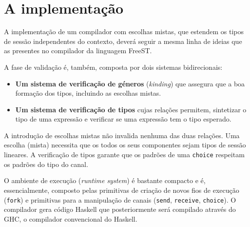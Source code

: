 \section{A implementação}

A implementação de um compilador com escolhas mistas, que estendem os tipos de sessão
independentes do contexto, deverá seguir a mesma linha de ideias que as presentes no compilador da linguagem FreeST\cite{2019freest,2019freest-inforum}.

A fase de validação é, também, composta por dois sistemas bidirecionais:
\begin{itemize}
\item \textbf{Um sistema de verificação de géneros} (\textit{kinding}) que assegura que a boa formação dos tipos, incluindo as escolhas mistas.
\item \textbf{Um sistema de verificação de tipos} cujas relações permitem, sintetizar o tipo de uma expressão e verificar se uma expressão tem o tipo esperado. 
\end{itemize}
A introdução de escolhas mistas não invalida nenhuma das duas relações.
Uma escolha (mista) necessita que os todos os seus componentes sejam tipos de sessão lineares. A verificação de tipos garante que os padrões de uma \lstinline|choice| respeitam os padrões do tipo do canal.

O ambiente de execução (\textit{runtime system}) é bastante compacto e é, essencialmente, composto pelas primitivas de criação de novos fios de execução (\lstinline|fork|) e primitivas para a manipulação de canais (\lstinline|send|, \lstinline|receive|, \lstinline|choice|). O compilador gera código Haskell que posteriormente será compilado através do GHC, o compilador convencional do Haskell.


